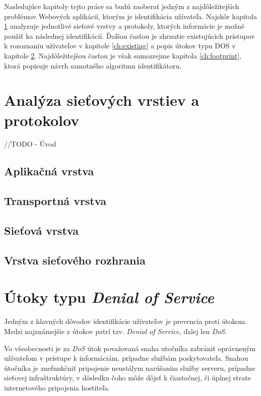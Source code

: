\documentclass[
  printed, %
  table,   %
  lof,     %
  lot,     %
]{fithesis3}
\begin{document}
Nasledujúce kapitoly tejto práce sa budú zaoberať jedným z najdôležitejších
problémov Webových aplikácií, ktorým je identifikácia užívateľa. Najskôr kapitola
\ref{ch:net-layers} analyzuje jednotlivé sieťové vrstvy a protokoly, ktorých
informácie je možné použiť ka následnej identifikácií. Ďalšou časťou je zhrnutie
existujúcich prístupov k rozoznaniu užívateľov v kapitole \ref{ch:existing} a 
popis útokov typu DOS v kapitole \ref{ch:dos}. Najdôležitejšou časťou je však
samozrejme kapitola \ref{ch:footprint}, ktorá popisuje návrh samotného 
algoritmu identifikátoru.

\chapter{Analýza sieťových vrstiev a protokolov}
\label{ch:net-layers}
//TODO - Úvod
\section{Aplikačná vrstva}
\section{Transportná vrstva}
\section{Sieťová vrstva}
\section{Vrstva sieťového rozhrania}

\chapter{Útoky typu \textit{Denial of Service}}
\label{ch:dos}
Jedným z hlavných dôvodov identifikácie užívateľov je prevencia proti útokom. Medzi
najznámejšie z útokov patrí tzv. \textit{Denial of Service}, ďalej len \textit{DoS}.

Vo všeobecnosti je za \textit{DoS} útok považovaná snaha utočníka zabrániť oprávneným
užívateľom v prístupe k informáciám, prípadne službám poskytovateľa. Snahou útočníka
je znefunkčniť pripojenie neustálym narúšaním služby serveru, prípadne sieťovej
infraštruktúry, v dôsledku čoho môže dôjsť k čiastočnej, či úplnej strate
internetového pripojenia hostiteľa. 
\end{document}
